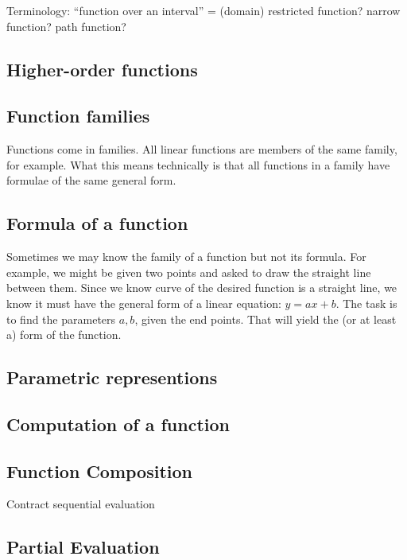 \documentclass[12pt]{tufte-handout}
\numberwithin{equation}{subsection}
\numberwithin{equation}{subsection}
\begin{document}
  {\todo Terminology: ``function over an interval'' = (domain)
    restricted function?  narrow function?  path function?


  \subsection{Higher-order functions}
  \label{subs:hiordfunc}


  \subsection{Function families}
  \label{subs:funcfamilies}

  Functions come in families.  All linear functions are members of the
  same family, for example.  What this means technically is that all
  functions in a family have formulae of the same general form.

  \subsection{Formula of a function}
  \label{subs:funcform}

  Sometimes we may know the family of a function but not its formula.
  For example, we might be given two points and asked to draw the
  straight line between them.  Since we know curve of the desired
  function is a straight line, we know it must have the general form
  of a linear equation: \(y=ax+b\).  The task is to find the
  parameters \(a,b\), given the end points.  That will yield the (or
  at least a) form of the function.

  \subsection{Parametric representions}

  \subsection{Computation of a function}


  \subsection{Function Composition}
  Contract sequential evaluation
  \subsection{Partial Evaluation}
}
\end{document}
